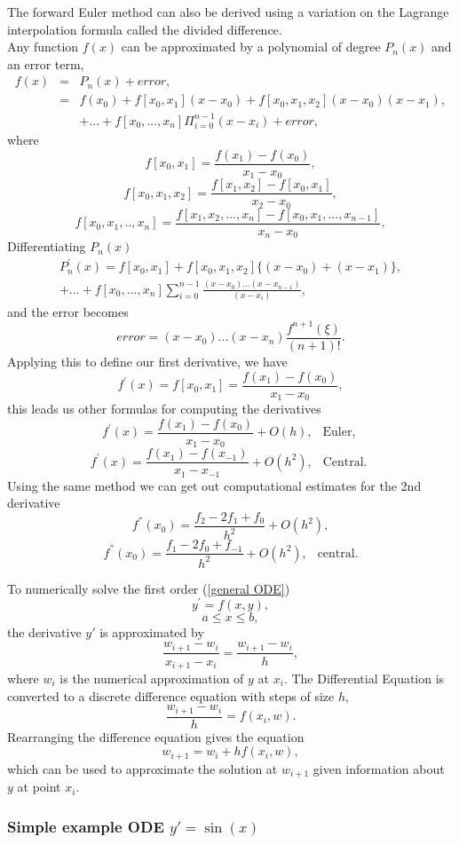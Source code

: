 The forward Euler method can also be derived using a variation on the Lagrange interpolation formula
called the divided difference. \\
Any function $f(x)$ can be approximated by a polynomial of degree $P_n(x)$ and an error term,
\begin{eqnarray*}
f(x)&=&P_n(x) + error,\\
&=&f(x_0)+f[x_0,x_1](x-x_0)+f[x_0,x_1,x_2](x-x_0)(x-x_1),\\
& &+...+f[x_0,...,x_n]\Pi_{i=0}^{n-1}(x-x_i)+error,
\end{eqnarray*}
where 
\[f[x_0,x_1] = \frac{f(x_1)-f(x_0)}{x_1-x_0},\]
\[f[x_0,x_1,x_2] = \frac{f[x_1,x_2]-f[x_0,x_1]}{x_2-x_0},\]
\[f[x_0,x_1,..,x_n] = \frac{f[x_1,x_2,...,x_n]-f[x_0,x_1,...,x_{n-1}]}{x_n-x_0},\]
Differentiating $P_n(x)$
\begin{eqnarray*}
P_n^{'}(x)=f[x_0,x_1]+f[x_0,x_1,x_2]\{(x-x_0)+(x-x_1)\}, \\
+...+f[x_0,...,x_n]\sum_{i=0}^{n-1}\frac{(x-x_0)...(x-x_{n-1})}{(x-x_i)},\end{eqnarray*}
and the error becomes
\[
error= (x-x_0)...(x-x_n)\frac{f^{n+1}(\xi)}{(n+1)!}.
\]
Applying this to define our first derivative, we have
\[
f^{'}(x)=f[x_0,x_1] = \frac{f(x_1)-f(x_0)}{x_1-x_0},\]
this leads us other formulas for computing the derivatives
\[ f^{'}(x) = \frac{f(x_1)-f(x_0)}{x_1-x_0}+O(h), \ \ \mbox{  Euler,  }\]
\[ f^{'}(x) = \frac{f(x_1)-f(x_{-1})}{x_1-x_{-1}}+O(h^2), \ \ \mbox{    Central.  }\]
Using the same method we can get out computational estimates for the 2nd 
derivative
\[f^{''}(x_0)=\frac{f_{2}-2f_1+f_0}{h^2}+O(h^2),\]
\[f^{''}(x_0)=\frac{f_{1}-2f_0+f_{-1}}{h^2}+O(h^2), \ \ \mbox{   central.}\]
\begin{example} To numerically solve the first order  (\ref{general ODE})
\[ y^{'} = f(x,y), \]
\[a\leq x \leq b, \]
the derivative $y{'}$ is approximated by \[\frac{w_{i+1}-w_{i}}{x_{i+1}-x_{i}}=\frac{w_{i+1}-w_{i}}{h},\]
where $w_i$ is the numerical approximation of $y$ at $x_i$.
The Differential Equation is converted to a discrete difference equation with steps of size $h$, 
\[\frac{w_{i+1}-w_i}{h}=f(x_i,w). \]
Rearranging the difference equation gives the equation 
\[w_{i+1}=w_i+hf(x_i,w), \]
which can be used to approximate the solution at $w_{i+1}$ given information about $y$ at point $x_i$.
\end{example}

\subsubsection{Simple example ODE $y'=\sin(x)$}

